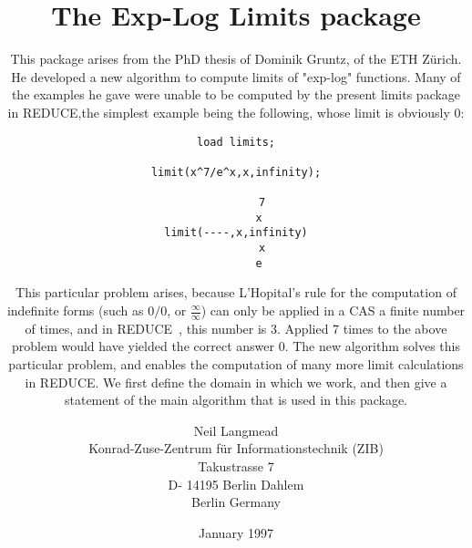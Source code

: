 \title{

\author{Neil Langmead \\
        Konrad-Zuse-Zentrum f\"ur Informationstechnik (ZIB) \\ 
        Takustrasse 7  \\
        D- 14195 Berlin Dahlem \\
        Berlin
        Germany}
\date{January 1997}

\def\foottitle{Limits}
\pagestyle{fancy}
\lhead[]{{\footnotesize\leftmark}{}}
\rhead[]{\thepage}
\setlength{\headrulewidth}{0.6pt}
\setlength{\footrulewidth}{0.6pt}
\addtolength{\oddsidemargin}{-20 mm}
\addtolength{\textwidth}{25 mm}
\pagestyle{fancy}
\setlength{\headrulewidth}{0.6pt}
\setlength{\footrulewidth}{0.6pt}
\setlength{\topmargin}{1 mm}
\setlength{\footskip}{10 mm}
\setlength{\textheight}{220 mm}
\cfoot{}
\rfoot{\small\foottitle}

\def\exprlist   {exp$_{1}$,exp$_{2}$, \ldots ,exp$_{{\tt n}}$}
\def\lineqlist  {lin\_eqn$_{1}$,lin\_eqn$_{2}$, \ldots ,lin\_eqn$_{n}$}

\pagebreak
\tableofcontents
\pagebreak
\section{The Exp-Log Limits package}
This package  arises from the PhD thesis of Dominik Gruntz, of the ETH  Z\"{u}rich. He developed a new algorithm to compute limits of "exp-log" functions. Many of the examples he gave were unable to be computed by the present limits package in \small{REDUCE},\normalsize the simplest example being the following, whose limit is obviously $0$:
\begin{verbatim}
load limits;

limit(x^7/e^x,x,infinity);

        7
       x
limit(----,x,infinity)
        x
       e
\end{verbatim}

This particular problem arises, because L'Hopital's rule for the computation of indefinite forms (such as $0/0$, or $\frac{\infty}{\infty}$) can only be applied in a CAS a finite number of times, and in \small{REDUCE}~\cite{Red36}, \normalsize this number is 3. Applied 7 times to the above problem would have yielded the correct answer 0. 
The new algorithm solves this particular problem, and enables the computation of many more limit calculations in \small{REDUCE}. \normalsize We first define the domain in which we work, and then give a statement of the main algorithm that is used in this package. \\

}
